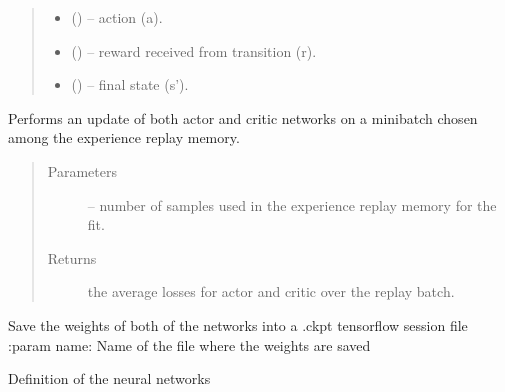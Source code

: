 \documentclass[letterpaper,10pt,english]{sphinxmanual}
\begin{document}
\begin{fulllineitems}
\begin{fulllineitems}
\begin{quote}
\begin{description}
\begin{itemize}
\item {} 
 () -- action (a).

\item {} 
 () -- reward received from transition (r).

\item {} 
 () -- final state (s').

\end{itemize}

\end{description}\end{quote}

\end{fulllineitems}


\begin{fulllineitems}
\label{\detokenize{package2:DDPG.DDPGAgent.replay}}
Performs an update of both actor and critic networks on a minibatch chosen among the experience replay memory.
\begin{quote}\begin{description}
\item[{Parameters}] \leavevmode
{} -- number of samples used in the experience replay memory for the fit.

\item[{Returns}] \leavevmode
the average losses for actor and critic over the replay batch.

\end{description}\end{quote}

\end{fulllineitems}


\begin{fulllineitems}
\label{\detokenize{package2:DDPG.DDPGAgent.save}}
Save the weights of both of the networks into a .ckpt tensorflow session file
:param name: Name of the file where the weights are saved

\end{fulllineitems}


\begin{fulllineitems}
\label{\detokenize{package2:DDPG.DDPGAgent.update_target}}
Definition of the neural networks

\end{fulllineitems}


\end{fulllineitems}
\end{document}
